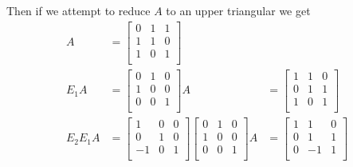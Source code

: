 \documentclass[12pt,letterpaper]{article}
\begin{document}
\begin{enumerate}
\begin{enumerate}
\begin{itemize}
              Then if we attempt to reduce $A$ to an upper triangular we get
              \begin{align*}
                A
                &=
                \begin{bmatrix}
                  0  &  1 &  1 \\
                  1  &  1 &  0 \\
                  1  &  0 &  1 \\
                \end{bmatrix}
                \\
                E_1A
                &=
                \begin{bmatrix}
                   0 &  1 &  0 \\
                   1 &  0 &  0 \\
                   0 &  0 &  1 \\
                \end{bmatrix}
                A
                &=
                \begin{bmatrix}
                   1 &  1 &  0 \\
                   0 &  1 &  1 \\
                   1 &  0 &  1 \\
                \end{bmatrix}
                \\
                E_2E_1A
                &=
                \begin{bmatrix}
                   1 &  0 &  0 \\
                   0 &  1 &  0 \\
                  -1 &  0 &  1 \\
                \end{bmatrix}
                \begin{bmatrix}
                   0 &  1 &  0 \\
                   1 &  0 &  0 \\
                   0 &  0 &  1 \\
                \end{bmatrix}
                A
                &=
                \begin{bmatrix}
                   1 &  1 &  0 \\
                   0 &  1 &  1 \\
                   0 & -1 &  1 \\
                \end{bmatrix}

\end{align*}
\end{itemize}
\end{enumerate}
\end{enumerate}
\end{document}
